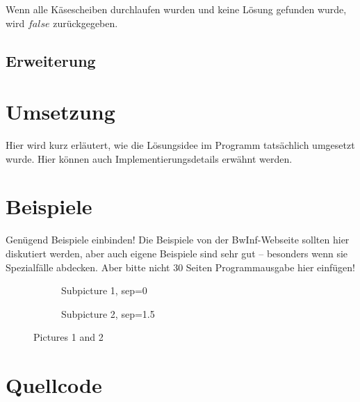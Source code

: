 \documentclass[a4paper,10pt,ngerman]{scrartcl}
\newcommand{\simplecube}[7]%
{
    \begin{scope}[shift={#1}]
        \fill[white  ,canvas is xy plane at z=#4] (0,0) rectangle (#2,#3);
        \fill[gray!40,canvas is yz plane at x=#2] (0,0) rectangle (#3,#4);
        \fill[gray!10,canvas is xz plane at y=#3] (0,0) rectangle (#2,#4);
        \foreach\i/\j in {0/1, 1/1, 1/0}
            {
            \draw[line#5] (0,#3*\i,#4*\j) --++ (#2,0,0);
            \draw[line#6] (#2*\i,0,#4*\j) --++ (0,#3,0);
            \draw[line#7] (#2*\i,#3*\j,0) --++ (0,0,#4);
        }
    \end{scope}
}
\newcommand{\cubeab}[4]%
{
    \begin{scope}[shift={#1}]
        \simplecube{(0    ,0    ,0    )}{#2}{#2}{#2}{a}{a}{a}
        \simplecube{(#2+#4,0    ,0    )}{#3}{#2}{#2}{b}{a}{a}
        \simplecube{(0    ,#2+#4,0    )}{#2}{#3}{#2}{a}{b}{a}
        \simplecube{(#2+#4,#2+#4,0    )}{#3}{#3}{#2}{b}{b}{a}
        \simplecube{(0    ,0    ,#2+#4)}{#2}{#2}{#3}{a}{a}{b}
        \simplecube{(#2+#4,0    ,#2+#4)}{#3}{#2}{#3}{b}{a}{b}
        \simplecube{(0    ,#2+#4,#2+#4)}{#2}{#3}{#3}{a}{b}{b}
        \simplecube{(#2+#4,#2+#4,#2+#4)}{#3}{#3}{#3}{b}{b}{b}
    \end{scope}
}
\begin{document}
    Wenn alle Käsescheiben durchlaufen wurden und keine Lösung gefunden wurde, wird $false$ zurückgegeben.

    \subsection{Erweiterung}\label{subsec:erweiterung_losungsidee}


    \section{Umsetzung}\label{sec:umsetzung}
    Hier wird kurz erläutert, wie die Lösungsidee im Programm tatsächlich umgesetzt wurde.
    Hier können auch Implementierungsdetails erwähnt werden.


    \section{Beispiele}\label{sec:beispiele}
    Genügend Beispiele einbinden!
    Die Beispiele von der BwInf-Webseite sollten hier diskutiert werden, aber auch eigene Beispiele sind sehr gut – besonders wenn sie Spezialfälle abdecken.
    Aber bitte nicht 30 Seiten Programmausgabe hier einfügen!

    \begin{figure}[H]\centering
    \def\a{3.2}
    \def\b{1.2}
    \begin{subfigure}[b]{0.45\textwidth}\centering %
    \caption{Subpicture 1, sep=0}\label{fig:figA}
    \end{subfigure}
    \begin{subfigure}[b]{0.45\textwidth}\centering %
    \caption{Subpicture 2, sep=1.5}\label{fig:figB}
    \end{subfigure}
    \caption{Pictures 1 and 2}\label{fig:figAB}
    \end{figure}

    \newpage


    \section{Quellcode}
    \label{sec:quellcode}
    \label{LastPage}
\end{document}
